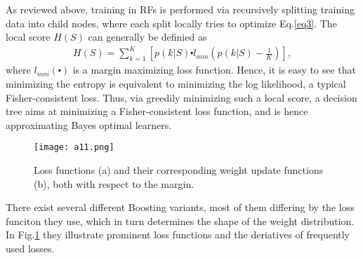 \documentclass[10pt,twocolumn,letterpaper]{article}
\begin{document}
As reviewed above, training in RFs is performed via recursively splitting training data into child nodes, where each split locally tries to optimize Eq.\ref{eq3}. The local score $H(S)$ can generally be definied as\\
\begin{gather*}
H(S) = \sum_{k=1}^K[p(k|S) \centerdot l_{mm} (p(k|S) - \frac{1}{K})],
\tag{5}
\end{gather*}
where $l_{mm}(\centerdot)$ is a margin maximizing loss function. Hence, it is easy to see that minimizing the entropy is equivalent to minimizing the log likelihood, a typical Fisher-consistent loss. Thus, via greedily minimizing such a local score, a decision tree aims at minimizing a Fisher-consistent loss function, and is hence approximating Bayes optimal learners.

\begin{figure}[htbp]
\begin{center}
\texttt{[image: a11.png]}
\end{center}
\caption{Loss functions (a) and their corresponding weight update functions (b), both with respect to the margin.}
\label{fig}
\end{figure}

There exist several different Boosting variants, most of them differing by the loss funciton they use, which in turn determines the shape of the weight distribution. In Fig.\ref{fig} they illustrate prominent loss functions and the deriatives of frequently used losses.




{\small


}
\end{document}
